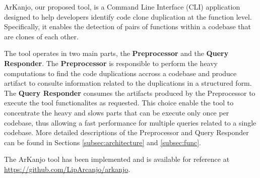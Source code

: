 \en

ArKanjo, our proposed tool, is a Command Line Interface (CLI) application designed to
help developers identify code clone duplication at the function level.
Specifically, it enables the detection of pairs of functions within a codebase
that are clones of each other.

The tool operates in two main parts, the \textbf{Preprocessor} and the \textbf{Query Responder}. 
The \textbf{Preprocessor} is responsible to perform the heavy computations to find the code duplications 
accross a codebase and produce artifact to consulte information related to the duplications in a structured form.
The \textbf{Query Responder} consumes the artifacts produced by the Preprocessor to execute the tool functionalites as requested.
This choice enable the tool to concentrate the heavy and slows parts that can be execute only once per codebase, 
thus allowing a fast performance for multiple queries related to a single codebase.
More detailed descriptions of the Preprocessor and Query Responder can be found in
Sections \ref{subsec:architecture} and \ref{subsec:func}.

The ArKanjo tool has been implemented and is available for reference at
\url{https://github.com/LipArcanjo/arkanjo}.

